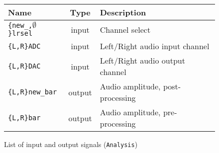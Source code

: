 \begin{figure}[h]
  \centering
  \caption{List of input and output signals (\texttt{Analysis})}
  \begin{tabular}{|l|c|l|}
    \hline
    Name & Type & Description \\    \hline
    \texttt{\{new\_,$\emptyset$\}lrsel} & input & Channel select \\    \hline
    \verb+{L,R}ADC+ & input & Left/Right audio input channel \\    \hline
    \verb+{L,R}DAC+ & input & Left/Right audio output channel \\    \hline
    \verb+{L,R}new_bar+ & output & Audio amplitude, post-processing\\    \hline
    \verb+{L,R}bar+ & output & Audio amplitude, pre-processing\\    \hline
  \end{tabular}
  \label{tab:analsig}
\end{figure}